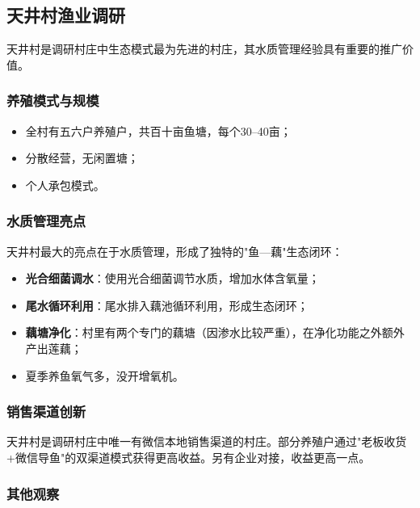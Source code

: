 \documentclass[12pt,a4paper]{article}
\begin{document}
\subsection{天井村渔业调研}

天井村是调研村庄中生态模式最为先进的村庄，其水质管理经验具有重要的推广价值。

\subsubsection{养殖模式与规模}

\begin{itemize}[leftmargin=2em]
    \item 全村有五六户养殖户，共百十亩鱼塘，每个30--40亩；
    \item 分散经营，无闲置塘；
    \item 个人承包模式。
\end{itemize}

\subsubsection{水质管理亮点}

天井村最大的亮点在于水质管理，形成了独特的"鱼---藕"生态闭环：
\begin{itemize}[leftmargin=2em]
    \item \textbf{光合细菌调水}：使用光合细菌调节水质，增加水体含氧量；
    \item \textbf{尾水循环利用}：尾水排入藕池循环利用，形成生态闭环；
    \item \textbf{藕塘净化}：村里有两个专门的藕塘（因渗水比较严重），在净化功能之外额外产出莲藕；
    \item 夏季养鱼氧气多，没开增氧机。
\end{itemize}

\subsubsection{销售渠道创新}

天井村是调研村庄中唯一有微信本地销售渠道的村庄。部分养殖户通过"老板收货+微信导鱼"的双渠道模式获得更高收益。另有企业对接，收益更高一点。

\subsubsection{其他观察}
\end{document}
